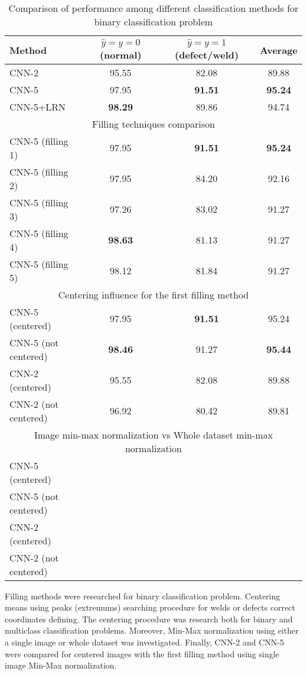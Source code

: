\begin{table}[!htb]
	\caption{\label{tab:comp1}Comparison of performance among different classification methods for binary classification problem}
	\begin{center}
		\small
		\begin{tabular}{| l | c | c | c |}
			\hline
			Method & $\hat{y}=y=0$ (normal) & $\hat{y}=y=1$ (defect/weld)  & Average \\
			\hline
			CNN-2 & 95.55 & 82.08 & 89.88 \\
			CNN-5 & 97.95 & \textbf{91.51} & \textbf{95.24} \\
			CNN-5+LRN & \textbf{98.29} & 89.86 & 94.74 \\
			\hline
			\multicolumn{4}{|c|}{Filling techniques comparison}  \\
			\hline
			CNN-5 (filling 1) & 97.95 & \textbf{91.51} & \textbf{95.24} \\
			CNN-5 (filling 2) & 97.95 & 84.20 & 92.16 \\
			CNN-5 (filling 3) & 97.26 & 83.02 & 91.27 \\
			CNN-5 (filling 4) & \textbf{98.63} & 81.13 & 91.27 \\
			CNN-5 (filling 5) & 98.12 & 81.84 & 91.27 \\
			\hline
			\multicolumn{4}{|c|}{Centering influence for the first filling method} \\
			\hline
			CNN-5 (centered) & 97.95 & \textbf{91.51} & 95.24 \\
			CNN-5 (not centered) & \textbf{98.46} & 91.27 & \textbf{95.44} \\
			CNN-2 (centered) & 95.55 & 82.08 & 89.88 \\
			CNN-2 (not centered) & 96.92 & 80.42 & 89.81 \\
			\hline
			\multicolumn{4}{|c|}{Image min-max normalization vs Whole dataset min-max normalization} \\
			\hline
			CNN-5 (centered) &  & &  \\
			CNN-5 (not centered) &   &  &  \\
			CNN-2 (centered) &  &  &  \\
			CNN-2 (not centered) &  &  &  \\
			\hline
		\end{tabular}
	\end{center}
\end{table}

Filling methods were researched for binary classification problem.
Centering means using peaks (extremums) searching procedure for welds or defects correct coordinates defining.
The centering procedure was research both for binary and multiclass classification problems.
Moreover, Min-Max normalization using either a single image or whole dataset was investigated.
Finally, CNN-2 and CNN-5 were compared for centered images with the first filling method using single image Min-Max normalization.

